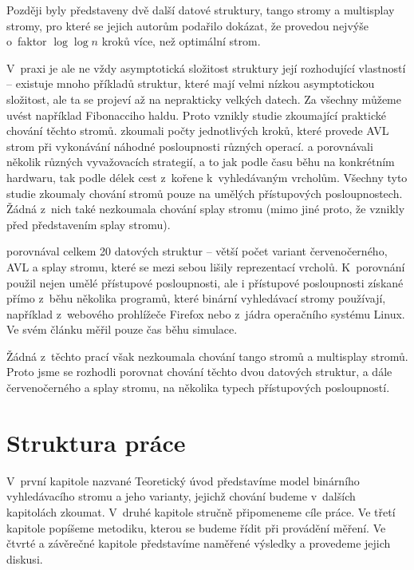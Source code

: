 Později byly představeny dvě další datové struktury, tango stromy a multisplay stromy, pro které se jejich autorům podařilo dokázat, že provedou nejvýše o~faktor $\log\log n$ kroků více, než optimální strom.

V~praxi je ale ne vždy asymptotická složitost struktury její rozhodující
vlastností -- existuje mnoho příkladů struktur, které mají velmi nízkou
asymptotickou složitost, ale ta se projeví až na neprakticky velkých datech. Za
všechny můžeme uvést například Fibonacciho haldu. Proto vznikly studie
zkoumající praktické chování těchto stromů. \citet{AVLperformance} zkoumali
počty jednotlivých kroků, které provede AVL strom při vykonávání náhodné
posloupnosti různých operací. \citet{comparison} a \citet{comparison2}
porovnávali několik různých vyvažovacích strategií, a to jak podle času běhu na konkrétním hardwaru, tak
podle délek cest z~kořene k~vyhledávaným vrcholům. Všechny tyto studie zkoumaly
chování stromů pouze na umělých přístupových posloupnostech. Žádná z~nich také
nezkoumala chování splay stromu (mimo jiné proto, že vznikly před představením
splay stromu).

\citet{performance} porovnával celkem 20 datových struktur -- větší počet variant červenočerného, AVL a splay stromu, které se mezi sebou lišily reprezentací vrcholů. K~porovnání použil nejen umělé přístupové posloupnosti, ale i přístupové posloupnosti získané přímo z~běhu několika programů, které binární vyhledávací stromy používají, například z~webového prohlížeče Firefox nebo z~jádra operačního systému Linux. Ve svém článku měřil pouze čas běhu simulace.

Žádná z~těchto prací však nezkoumala chování tango stromů a multisplay stromů. Proto jsme se rozhodli porovnat chování těchto dvou datových struktur, a dále červenočerného a splay stromu, na několika typech přístupových posloupností.

\section*{Struktura práce}

V~první kapitole nazvané Teoretický úvod představíme model binárního vyhledávacího stromu a jeho varianty, jejichž chování budeme v~dalších kapitolách zkoumat. V~druhé kapitole stručně připomeneme cíle práce. Ve třetí kapitole popíšeme metodiku, kterou se budeme řídit při provádění měření. Ve čtvrté a závěrečné kapitole představíme naměřené výsledky a provedeme jejich diskusi.
